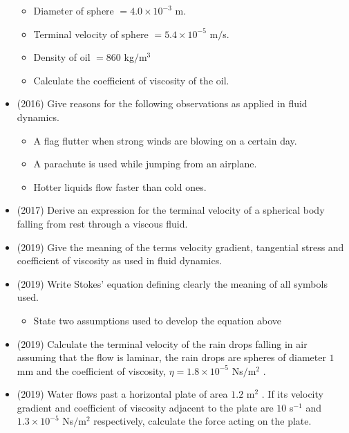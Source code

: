 \documentclass{article}
\begin{document}
\begin{itemize}
\begin{itemize}
\item Diameter of sphere $ =4.0 \times 10^{-3}$ m.
\item Terminal velocity of sphere $ =5.4 \times 10^{-5}$ m$/$s.
\item Density of oil $ =860$ kg$/$m$ ^{3}$
\item Calculate the coefficient of viscosity of the oil.
\end{itemize}
\item (2016)  Give reasons for the following observations as applied in fluid dynamics.
 \begin{itemize}
\item A flag flutter when strong winds are blowing on a certain day.
\item A parachute is used while jumping from an airplane.
\item Hotter liquids flow faster than cold ones.
\end{itemize}
\item (2017)  Derive an expression for the terminal velocity of a spherical body falling  from rest through a viscous fluid. 
\item (2019)  Give the meaning of the terms velocity gradient, tangential stress and coefficient of viscosity as used in fluid dynamics.
\item (2019)  Write Stokes’ equation defining clearly the meaning of all symbols used.
 \begin{itemize}
\item State two assumptions used to develop the equation above
\end{itemize}
\item (2019)  Calculate the terminal velocity of the rain drops falling in air assuming that the flow is laminar, the rain drops are spheres of diameter $ 1$ mm and the coefficient of viscosity, $ \eta =1.8 \times 10^{-5}$ Ns$/$m$ ^{2}$ . 
\item (2019)  Water flows past a horizontal plate of area $ 1.2$ m$ ^{2}$ . If its velocity gradient and coefficient of viscosity adjacent to the plate are $ 10$ s$ ^{-1}$ and $ 1.3 \times 10^{-5}$ Ns$/$m$ ^{2}$ respectively, calculate the force acting on the plate.  
\end{itemize}
\end{document}
